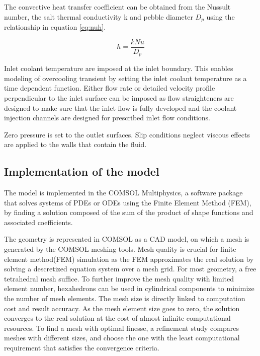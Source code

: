 \documentclass{elsarticle}
\begin{document}
The convective heat transfer coefficient can be obtained from the Nussult number, the salt thermal conductivity k and pebble diameter $D_p$ using the relationship in equation \ref{eq:nuh}.

\begin{equation}
  h = \frac{kNu}{D_p}
  \label{eq:nuh}
\end{equation}


Inlet coolant temperature are imposed at the inlet boundary.  This enables modeling of overcooling transient by setting the inlet coolant temperature as a time dependent function. Either flow rate or detailed velocity profile perpendicular to the inlet surface can be imposed as flow straighteners are designed to make sure that the inlet flow is fully developed and the coolant injection channels are designed for prescribed inlet flow conditions.

Zero pressure is set to the outlet surfaces. Slip conditions neglect viscous effects are applied to the walls that contain the fluid.  



\subsection{Implementation of the model}
\label{sec:implementation}

The model is implemented in the COMSOL Multiphysics, a software package that solves systems of PDEs or ODEs using the Finite Element Method (FEM), by finding a solution composed of the sum of the product of shape functions and associated coefficients. 
 
The geometry is represented in COMSOL as a CAD model, on which a mesh is generated by the COMSOL meshing tools.
Mesh quality is crucial for finite element method(FEM) simulation as the FEM approximates the real solution by solving a descretized equation system over a mesh grid. For most geometry, a free tetrahedral mesh suffice. To further improve the mesh quality with limited element number, hexahedrons can be used in cylindrical components to minimize the number of mesh elements. The mesh size is directly linked to computation cost and result accuracy. As the mesh element size goes to zero, the solution converges to the real solution at the cost of almost infinite computational resources. 
To find a mesh with optimal finesse, a refinement study compares meshes with different sizes, and choose the one with the least computational requirement that satisfies the convergence criteria. 
\end{document}
